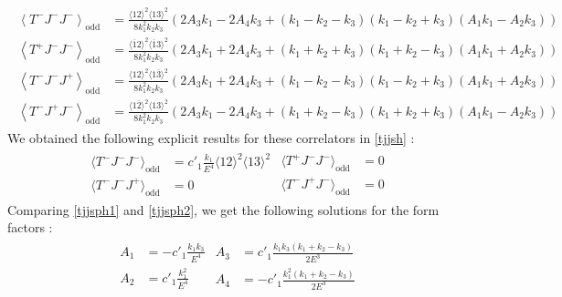 \documentclass[a4paper,11pt]{article}
\begin{document}
\begin{align}\label{tjjsph2}
\begin{split}
\left\langle T^{-} J^{-} J^{-}\right\rangle_{\text{odd}}&=\frac{\langle 12\rangle^{2}\langle 13\rangle^{2}}{8 k_{1}^{2} k_{2} k_{3}}\left(2A_3 k_1-2A_4 k_3+(k_1-k_2-k_3)(k_1-k_2+k_3)(A_1k_1-A_2k_3)\right) \\[5 pt]
\left\langle T^{+} J^{-} J^{-}\right\rangle_{\text{odd}}&=\frac{\langle\overline{1} 2\rangle^{2}\langle\overline{1} 3\rangle^{2}}{8 k_{1}^{2} k_{2} k_{3}}\left(2A_3 k_1+2A_4 k_3+(k_1+k_2+k_3)(k_1+k_2-k_3)(A_1k_1+A_2k_3)\right)  \\[5 pt]
\left\langle T^{-} J^{-} J^{+}\right\rangle_{\text{odd}}&=\frac{\langle 12\rangle^{2}\langle 1 \overline{3}\rangle^{2}}{8 k_{1}^{2} k_{2} k_{3}}\left(2A_3 k_1+2A_4 k_3+(k_1-k_2-k_3)(k_1-k_2+k_3)(A_1k_1+A_2k_3)\right) \\[5 pt]
\left\langle T^{-} J^{+} J^{-}\right\rangle_{\text{odd}}&=\frac{\langle 1\overline{2}\rangle^{2}\langle 1 3\rangle^{2}}{8 k_{1}^{2} k_{2} k_{3}}\left(2A_3 k_1-2A_4 k_3+(k_1+k_2-k_3)(k_1+k_2+k_3)(A_1k_1-A_2k_3)\right) 
\end{split}
\end{align}
%
We obtained the following explicit results for these correlators in \eqref{tjjsh} :
\begin{align}\label{tjjsph1}
\begin{split}
\langle T^-J^-J^- \rangle_{\text{odd}} &= c'_1 \frac{k_1}{E^4}\langle 12 \rangle^2 \langle 13 \rangle^2\\
\langle T^-J^-J^+ \rangle_{\text{odd}}  &= 0
\end{split}
\begin{split}
\langle T^+J^-J^- \rangle_{\text{odd}} &= 0\\
\langle T^-J^+J^- \rangle_{\text{odd}} &=0
\end{split}
\end{align}
%
Comparing \eqref{tjjsph1} and \eqref{tjjsph2}, we get the following solutions for the form factors :
\begin{align}\label{a1a2a3}
\begin{split}
A_1 &= -c'_1 \frac{k_1 k_3}{E^4}\\
A_2 &=c'_1\frac{k_1^2}{E^4}
\end{split}
\begin{split}
A_3 &= c'_1\frac{k_1 k_3(k_1+k_2-k_3)}{2E^3}\\
A_4 &=- c'_1 \frac{k_1^2(k_1+k_2-k_3)}{2E^3}
\end{split}
\end{align}
\end{document}
